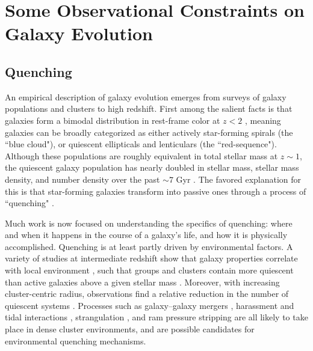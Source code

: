 
\section{Some Observational Constraints on Galaxy Evolution}
\subsection{Quenching}

An empirical description of galaxy evolution emerges from surveys of galaxy populations and clusters to high redshift.
First among the salient facts is that galaxies form a bimodal distribution in rest-frame color at $z < 2$ \citep{Strateva:2001aa,Baldry:2004aa,Bell:2004aa,Williams:2009tt}, meaning galaxies can be broadly categorized as either actively star-forming spirals (the ``blue cloud"), or quiescent ellipticals and lenticulars (the ``red-sequence").
Although these populations are roughly equivalent in total stellar mass at $z\sim1$, the quiescent galaxy population has nearly doubled in stellar mass, stellar mass density, and number density over the past $\sim7$ Gyr \citep{Arnouts:2007aa,Bell:2004aa,Borch:2006aa,Bundy:2006aa,Brown:2007aa,Faber:2007aa}.
The favored explanation for this is that star-forming galaxies transform into passive ones through a process of ``quenching" \citep{Blanton:2006aa,Bundy:2006aa,Faber:2007aa,Brammer:2011aa}.

Much work is now focused on understanding the specifics of quenching: where and when it happens in the course of a galaxy's life, and how it is physically accomplished.
Quenching is at least partly driven by environmental factors.
A variety of studies at intermediate redshift show that galaxy properties correlate with local environment \citep{Cooper:2006aa,Cooper:2007aa,Quadri:2007aa,Patel:2009aa}, such that groups and clusters contain more quiescent than active galaxies above a given stellar mass \citep{George:2011aa,Muzzin:2012dw,Presotto:2012aa,Tanaka:2012aa,Nantais:2017aa}.
Moreover, with increasing cluster-centric radius, observations find a relative reduction in the number of quiescent systems \cite[e.g.][]{Presotto:2012aa}.
Processes such as galaxy–galaxy mergers \citep{Lavery:1988aa}, harassment and tidal interactions \citep{Moore:1998aa,Bekki:2011aa}, strangulation \citep{Larson:1980aa}, and ram pressure stripping \citep{Gunn:1972aa} are all likely to take place in dense cluster environments, and are possible candidates for environmental quenching mechanisms.

